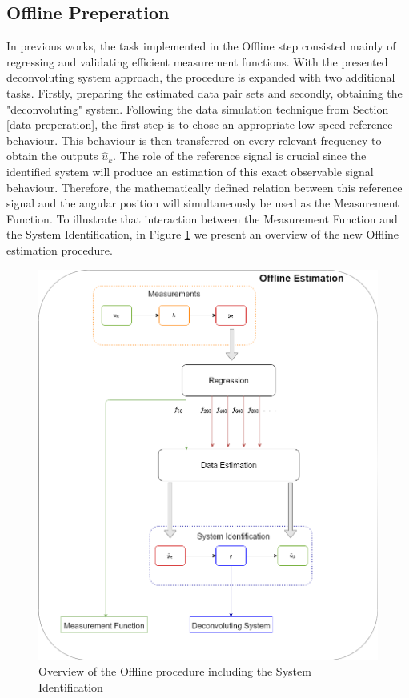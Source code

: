 \documentclass[english]{isasthesis}
\begin{document}
    	\subsection{Offline Preperation}	
    	In previous works, the task implemented in the Offline step consisted mainly of regressing and validating efficient measurement functions. With the presented deconvoluting system approach, the procedure is expanded with two additional tasks. Firstly, preparing the estimated data pair sets and secondly, obtaining the "deconvoluting" system. Following the data simulation technique from Section \ref{data preperation}, the first step is to chose an appropriate low speed reference behaviour. This behaviour is then transferred on every relevant frequency to obtain the outputs $\hat{u}_k$. The role of the reference signal is crucial since the identified system will produce an estimation of this exact observable signal behaviour. Therefore, the mathematically defined relation between this reference signal and the angular position will simultaneously be used as the Measurement Function. To illustrate that interaction between the Measurement Function and the System Identification, in Figure \ref{fig:offline sid} we present an overview of the new Offline estimation procedure.
    	 \begin{figure}[p]
    		\begin{center}
    			\includegraphics[width=1\textwidth]{figures/offline_sid_1.png}   
  			\end{center}
    		\caption{Overview of the Offline procedure including the System Identification }
    		\label{fig:offline sid}
    		\end{figure}
\end{document}
